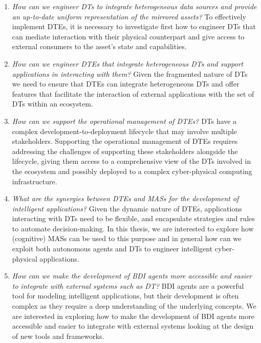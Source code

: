 \begin{enumerate}[label=\textbf{RQ\arabic*}]

  \item\label{rq:1}
  \emph{How can we engineer \acp{DT} to integrate heterogeneous data sources and provide an up-to-date uniform representation of the mirrored assets?}
  \newline
  To effectively implement \acp{DTE}, it is necessary to investigate first how to engineer \acp{DT} that can mediate interaction with their physical counterpart and give access to external consumers to the asset's state and capabilities.

  \item\label{rq:2}
  \emph{How can we engineer \acp{DTE} that integrate heterogeneous \acp{DT} and support applications in interacting with them?}
  \newline
  Given the fragmented nature of \acp{DT} we need to ensure that \acp{DTE} can integrate heterogeneous \acp{DT} and offer features that facilitate the interaction of external applications with the set of \acp{DT} within an ecosystem.

  \item\label{rq:3}
  \emph{How can we support the operational management of \acp{DTE}?}
  \newline
  \acp{DT} have a complex development-to-deployment lifecycle that may involve multiple stakeholders. Supporting the operational management of \acp{DTE} requires addressing the challenges of supporting these stakeholders alongside the lifecycle, giving them access to a comprehensive view of the \acp{DT} involved in the ecosystem and possibly deployed to a complex cyber-physical computing infrastructure.
  
  \item\label{rq:4}
  \emph{What are the synergies between \acp{DTE} and \acp{MAS} for the development of intelligent applications?}
  \newline
  Given the dynamic nature of \acp{DTE}, applications interacting with \acp{DT} need to be flexible, and encapsulate strategies and rules to automate decision-making. In this thesis, we are interested to explore how (cognitive) \acp{MAS} can be used to this purpose and in general how can we exploit both autonomous agents and \acp{DT} to engineer intelligent cyber-physical applications.  


  \item\label{rq:5}
  \emph{How can we make the development of \ac{BDI} agents more accessible and easier to integrate with external systems such as \ac{DT}?}
  \newline
  \ac{BDI} agents are a powerful tool for modeling intelligent applications, but their development is often complex as they require a deep understanding of the underlying concepts. We are interested in exploring how to make the development of \ac{BDI} agents more accessible and easier to integrate with external systems looking at the design of new tools and frameworks.
\end{enumerate}


